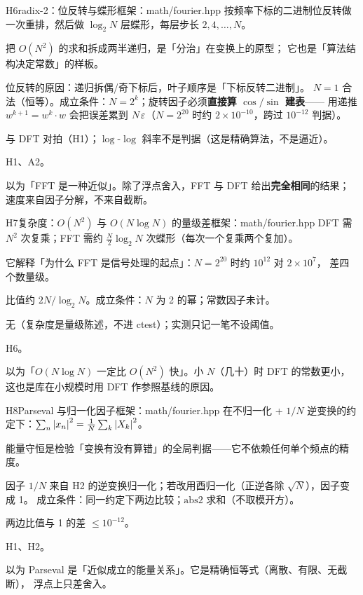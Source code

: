 \begin{know}{H6}{radix-2：位反转与蝶形}{框架：math/fourier.hpp}
 按频率下标的二进制位反转做一次重排，然后做 $\log_2N$ 层蝶形，每层步长 $2,4,\dots,N$。

 把 $O(N^{2})$ 的求和拆成两半递归，是「分治」在变换上的原型；
它也是「算法结构决定常数」的样板。

 位反转的原因：递归拆偶/奇下标后，叶子顺序是「下标反转二进制」。
$N=1$ 合法（恒等）。成立条件：$N=2^{k}$；旋转因子必须\textbf{直接算 $\cos/\sin$ 建表}——
用递推 $w^{k+1}=w^{k}\cdot w$ 会把误差累到 $N\varepsilon$（$N=2^{20}$ 时约 $2\times10^{-10}$，跨过 $10^{-12}$ 判据）。

 与 DFT 对拍（H1）；$\log$-$\log$ 斜率不是判据（这是精确算法，不是逼近）。

 H1、A2。

 以为「FFT 是一种近似」。除了浮点舍入，FFT 与 DFT 给出\textbf{完全相同}的结果；
速度来自因子分解，不来自截断。
\end{know}

\begin{know}{H7}{复杂度：$O(N^{2})$ 与 $O(N\log N)$ 的量级差}{框架：math/fourier.hpp}
 DFT 需 $N^{2}$ 次复乘；FFT 需约 $\frac N2\log_2N$ 次蝶形（每次一个复乘两个复加）。

 它解释「为什么 FFT 是信号处理的起点」：$N=2^{20}$ 时约 $10^{12}$ 对 $2\times10^{7}$，
差四个数量级。

 比值约 $2N/\log_2N$。成立条件：$N$ 为 2 的幂；常数因子未计。

 无（复杂度是量级陈述，不进 ctest）；实测只记一笔不设阈值。

 H6。

 以为「$O(N\log N)$ 一定比 $O(N^{2})$ 快」。小 $N$（几十）时 DFT 的常数更小，
这也是库在小规模时用 DFT 作参照基线的原因。
\end{know}

\begin{know}{H8}{Parseval 与归一化因子}{框架：math/fourier.hpp}
 在不归一化 + $1/N$ 逆变换的约定下：$\sum_n\left\lvert x_n\right\rvert^{2}=\frac1N\sum_k\left\lvert X_k\right\rvert^{2}$。

 能量守恒是检验「变换有没有算错」的全局判据——它不依赖任何单个频点的精度。

 因子 $1/N$ 来自 H2 的逆变换归一化；若改用酉归一化（正逆各除 $\sqrt N$），因子变成 1。
成立条件：同一约定下两边比较；$\mathrm{abs2}$ 求和（不取模开方）。

 两边比值与 1 的差 $\le10^{-12}$。

 H1、H2。

 以为 Parseval 是「近似成立的能量关系」。它是精确恒等式（离散、有限、无截断），
浮点上只差舍入。
\end{know}

